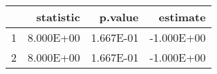 \begin{table}[ht]
\centering
\begin{tabular}{rrrr}
  \hline
 & statistic & p.value & estimate \\ 
  \hline
1 & 8.000E+00 & 1.667E-01 & -1.000E+00 \\ 
  2 & 8.000E+00 & 1.667E-01 & -1.000E+00 \\ 
   \hline
\end{tabular}
\end{table}
